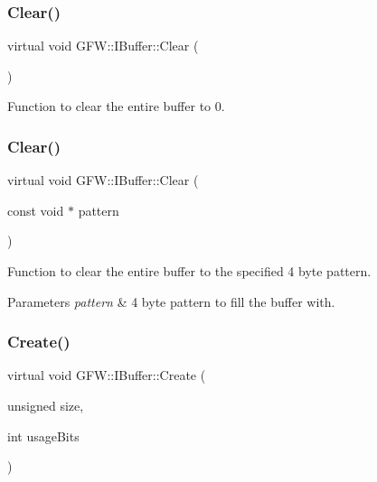 \subsubsection{\texorpdfstring{Clear()}{Clear()}\hspace{0.1cm}{\footnotesize\ttfamily [1/2]}}
{\footnotesize\ttfamily virtual void G\+F\+W\+::\+I\+Buffer\+::\+Clear (\begin{DoxyParamCaption}{ }\end{DoxyParamCaption})\hspace{0.3cm}{\ttfamily [pure virtual]}}



Function to clear the entire buffer to 0. 

\mbox{\label{class_g_f_w_1_1_i_buffer_ac1605029b3f1e8cbfef8d30053ddac59}} 
\subsubsection{\texorpdfstring{Clear()}{Clear()}\hspace{0.1cm}{\footnotesize\ttfamily [2/2]}}
{\footnotesize\ttfamily virtual void G\+F\+W\+::\+I\+Buffer\+::\+Clear (\begin{DoxyParamCaption}\item[{const void $\ast$}]{pattern }\end{DoxyParamCaption})\hspace{0.3cm}{\ttfamily [pure virtual]}}



Function to clear the entire buffer to the specified 4 byte pattern. 


\begin{DoxyParams}{Parameters}
{\em pattern} & 4 byte pattern to fill the buffer with. \\
\hline
\end{DoxyParams}
\mbox{\label{class_g_f_w_1_1_i_buffer_aeda77fc8f158dd79bc28520f92827f92}} 
\subsubsection{\texorpdfstring{Create()}{Create()}\hspace{0.1cm}{\footnotesize\ttfamily [1/2]}}
{\footnotesize\ttfamily virtual void G\+F\+W\+::\+I\+Buffer\+::\+Create (\begin{DoxyParamCaption}\item[{unsigned}]{size,  }\item[{int}]{usage\+Bits }\end{DoxyParamCaption})\hspace{0.3cm}{\ttfamily [pure virtual]}}



